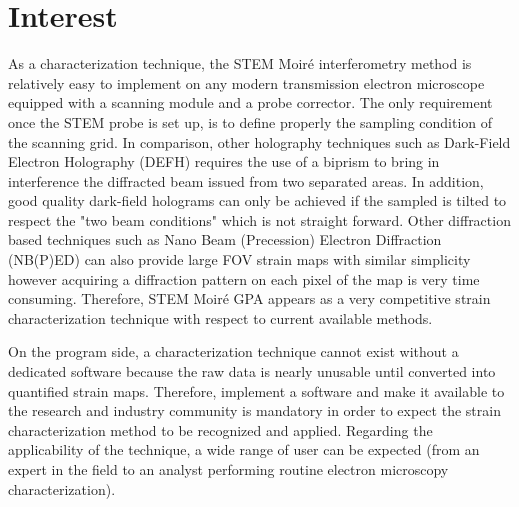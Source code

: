 \documentclass{article}
\begin{document}
\section{Interest}
As a characterization technique, the STEM Moir{\'e} interferometry method is relatively easy to implement on any modern transmission electron microscope equipped with a scanning module and a probe corrector. The only requirement once the STEM probe is set up, is to define properly the sampling condition of the scanning grid. In comparison, other holography techniques such as Dark-Field Electron Holography (DEFH) \cite{Hytch2008} requires the use of a biprism to bring in interference the diffracted beam issued from two separated areas. In addition, good quality dark-field holograms can only be achieved if the sampled is tilted to respect the "two beam conditions" which is not straight forward. Other diffraction based techniques such as Nano Beam (Precession) Electron Diffraction (NB(P)ED) \cite{Rouviere2013} can also provide large FOV strain maps with similar simplicity however acquiring a diffraction pattern on each pixel of the map is very time consuming. Therefore, STEM Moir{\'e} GPA appears as a very competitive strain characterization technique with respect to current available methods.\par \medskip
On the program side, a characterization technique cannot exist without a dedicated software because the raw data is nearly unusable until converted into quantified strain maps. Therefore, implement a software and make it available to the research and industry community is mandatory in order to expect the strain characterization method to be recognized and applied. Regarding the applicability of the technique, a wide range of user can be expected (from an expert in the field to an analyst performing routine electron microscopy characterization). 



\end{document}
